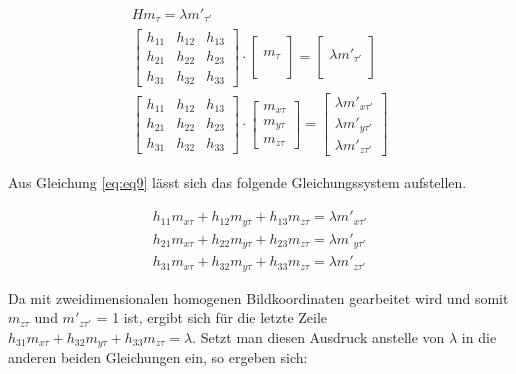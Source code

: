 \begin{gather}
	 H m_\tau = \lambda m'_{\tau'}\\
	\begin{bmatrix}
		h_{11}&h_{12}&h_{13}\\
		h_{21}&h_{22}&h_{23}\\
		h_{31}&h_{32}&h_{33}
	\end{bmatrix}
	\cdot
	\begin{bmatrix}
		\\m_\tau\\\\
	\end{bmatrix}
	=
	\begin{bmatrix}
		\\\lambda m'_{\tau'}\\\\
	\end{bmatrix}\\
	\begin{bmatrix}
		h_{11}&h_{12}&h_{13}\\
		h_{21}&h_{22}&h_{23}\\
		h_{31}&h_{32}&h_{33}
	\end{bmatrix}
	\cdot
	\begin{bmatrix}
		m_{x \tau}\\m_{y \tau}\\m_{z \tau}
	\end{bmatrix}
	=
	\begin{bmatrix}
		\lambda m'_{x \tau'}\\\lambda m'_{y \tau'}\\\lambda m'_{z \tau'}\label{eq:eq9}
	\end{bmatrix}
\end{gather}

Aus Gleichung \ref{eq:eq9} lässt sich das folgende Gleichungssystem aufstellen.  

\begin{gather}
	h_{11}m_{x \tau}+h_{12}m_{y \tau}+h_{13}m_{z \tau}= \lambda m'_{x\tau'}\\
	h_{21}m_{x\tau}+h_{22}m_{y\tau}+h_{23}m_{z\tau}= \lambda m'_{y\tau'}\\
	h_{31}m_{x\tau}+h_{32}m_{y\tau}+h_{33}m_{z\tau}= \lambda m'_{z\tau'}
\end{gather}

Da mit zweidimensionalen homogenen Bildkoordinaten gearbeitet wird und somit $m_{z\tau}$ und $m'_{z\tau'}$ = 1 ist, ergibt sich für die letzte Zeile $h_{31}m_{x\tau}+h_{32}m_{y\tau}+h_{33}m_{z\tau}= \lambda$. Setzt man diesen Ausdruck anstelle von $\lambda$ in die anderen beiden Gleichungen ein, so ergeben sich:

